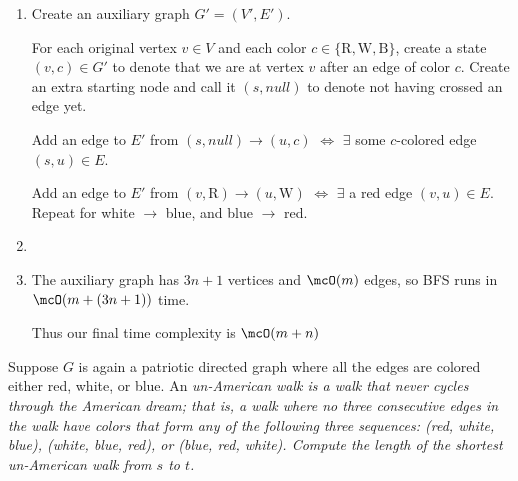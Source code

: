 \documentclass{article}
\begin{document}
\begin{solution}

\begin{enumerate}[label=(\alph*)]
  \item Create an auxiliary graph \( G'=(V',E') \).

  For each original vertex \( v\in V \) and each color \( c \in \{\text{R},\text{W},\text{B}\} \), create a state \( (v,c) \in G' \) to denote that we are at vertex \( v \) after an edge of color \( c \).
  Create an extra starting node and call it \( (s, null) \) to denote not having crossed an edge yet.

  Add an edge to \( E' \) from \( (s,null) \to (u,c) \) \( \iff \) \( \exists \) some \( c \)-colored edge \( (s,u)\in E \).

  Add an edge to \( E' \) from \( (v,\mathrm{R}) \to (u,\mathrm{W}) \) \( \iff \) \( \exists \) a red edge \( (v, u)\in E \). Repeat for white \( \to \) blue, and blue \( \to \) red.

  \item {}
  \item The auxiliary graph has \( 3n + 1 \) vertices and \( \mcO(m) \) edges, so BFS runs in \( \mcO(m+(3n+1)) \) time.

  Thus our final time complexity is \( \mcO(m+n) \)
\end{enumerate}
\end{solution}
\pagebreak

\begin{subexercise} %
  Suppose \( G \) is again a patriotic directed graph where all the edges are colored either red, white, or blue.
  An \it{un-American walk} is a walk that never cycles through the American dream; that is, a walk where no three consecutive edges in the walk have colors that form any of the following three sequences: (red, white, blue), (white, blue, red), or (blue, red, white).
  Compute the length of the shortest un-American walk from \( s \) to \( t \).
\end{subexercise}
\end{document}
